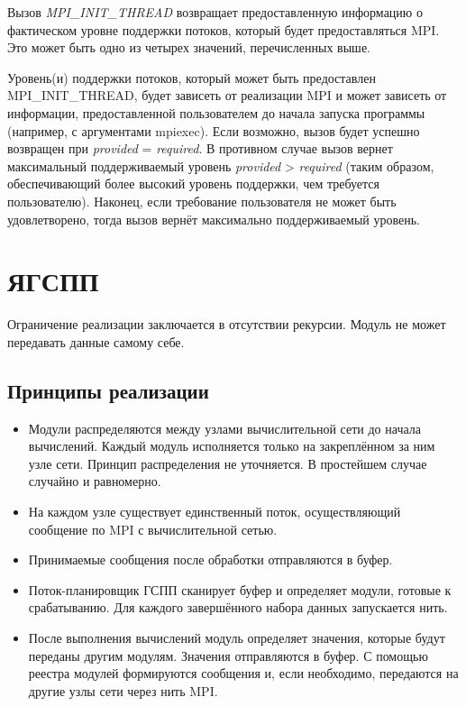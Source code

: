 	Вызов \textit{MPI\_INIT\_THREAD} возвращает предоставленную информацию о фактическом уровне поддержки потоков, который будет предоставляться MPI. 
	Это может быть одно из четырех значений, перечисленных выше.
	
	Уровень(и) поддержки потоков, который может быть предоставлен MPI\_INIT\_THREAD, будет зависеть от реализации MPI и может зависеть от информации, предоставленной пользователем до начала запуска программы (например, с аргументами mpiexec). 
	Если возможно, вызов будет успешно возвращен при \textit{provided} = \textit{required}. 
	В противном случае вызов вернет максимальный поддерживаемый уровень \textit{provided} > \textit{required} (таким образом, обеспечивающий более высокий уровень поддержки, чем требуется пользователю).
	Наконец, если требование пользователя не может быть удовлетворено, тогда вызов вернёт максимально поддерживаемый уровень.
	
\chapter{ЯГСПП}
	Ограничение реализации заключается в отсутствии рекурсии. Модуль не может передавать данные самому себе.

	\section{Принципы реализации}
	\begin{itemize}
		\item Модули распределяются между узлами вычислительной сети до начала вычислений. Каждый модуль исполняется только на закреплённом за ним узле сети. Принцип распределения не уточняется. В простейшем случае случайно и равномерно.
		\item На каждом узле существует единственный поток, осуществляющий сообщение по MPI с вычислительной сетью.
		\item Принимаемые сообщения после обработки отправляются в буфер.
		\item Поток-планировщик ГСПП сканирует буфер и определяет модули, готовые к срабатыванию. Для каждого завершённого набора данных запускается нить. 
		\item После выполнения вычислений модуль определяет значения, которые будут переданы другим модулям. Значения отправляются в буфер. С помощью реестра модулей формируются сообщения и, если необходимо, передаются на другие узлы сети через нить MPI.
	\end{itemize}
	


	